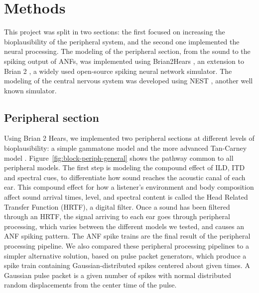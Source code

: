 \documentclass[11pt,a4paper,twocolumn]{article}
\begin{document}
\section{Methods}
This project was split in two sections: the first focused on increasing the bioplausibility of the peripheral system, and the second one implemented the neural processing. The modeling of the peripheral section, from the sound to the spiking output of ANFs, was implemented using Brian2Hears \cite{fontaineBrianHearsOnline2011}, an extension to Brian 2 \cite{stimbergBrian2Intuitive2019}, a widely used open-source spiking neural network simulator. The modeling of the central nervous system was developed using NEST \cite{gewaltigNESTNEuralSimulation2007}, another well known simulator.

\subsection{Peripheral section}
Using Brian 2 Hears, we implemented two peripheral sections at different levels of bioplausibility: a simple gammatone model and the more advanced Tan-Carney model \cite{tanPhenomenologicalModelResponses2003}.
Figure~\ref{fig:block-periph-general} shows the pathway common to all peripheral models. The first step is modeling the compound effect of ILD, ITD and spectral cues, to differentiate how sound reaches the acoustic canal of each ear. This compound effect for how a listener's environment and body composition affect sound arrival times, level, and spectral content is called the Head Related Transfer Function (HRTF), a digital filter. Once a sound has been filtered through an HRTF, the signal arriving to each ear goes through peripheral processing, which varies between the different models we tested, and causes an ANF spiking pattern. The ANF spike trains are the final result of the peripheral processing pipeline.
We also compared these peripheral processing pipelines to a simpler alternative solution, based on pulse packet generators, which produce a spike train containing Gaussian-distributed spikes centered about given times. A Gaussian pulse packet is a given number of spikes with normal distributed random displacements from the center time of the pulse.


\end{document}
